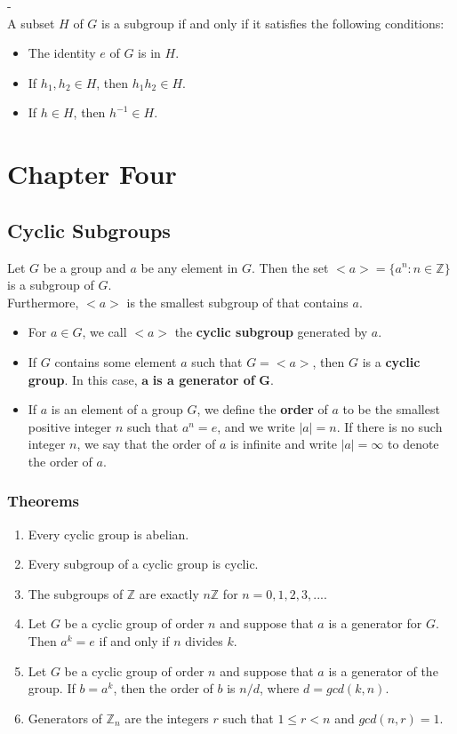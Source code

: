 \documentclass{article}
\begin{document}
-\\A subset $H$ of $G$ is a subgroup if and only if it satisfies the following conditions:
\begin{itemize}
    \item The identity $e$ of $G$ is in $H$.
    \item If $h_1,h_2\in H$, then $h_1 h_2\in H$.
    \item If $h\in H$, then $h^{-1}\in H$.
\end{itemize}

\section{Chapter Four}
\subsection{Cyclic Subgroups}
Let $G$ be a group and $a$ be any element in $G$. Then the set $<a>=\{a^{n}: n\in \mathbb{Z}\}$ is a subgroup of $G$. \\
Furthermore, $<a>$ is the smallest subgroup of that contains $a$.
\begin{itemize}
    \item For $a\in G$, we call $<a>$ the \textbf{cyclic subgroup} generated by $a$.
    \item If $G$ contains some element $a$ such that $G=<a>$, then $G$ is a \textbf{cyclic group}. In this case, $\mathbf{a}$ \textbf{is a generator of }$\mathbf{G}$.
    \item If $a$ is an element of a group $G$, we define the \textbf{order} of $a$ to be the smallest positive integer $n$ such that $a^n=e$, and we write $|a|=n$. If there is no such integer $n$, we say that the order of $a$ is infinite and write $|a|=\infty$ to denote the order of $a$.
\end{itemize}
\subsubsection{Theorems}
\begin{enumerate}
    \item Every cyclic group is abelian.
    \item Every subgroup of a cyclic group is cyclic.
    \item The subgroups of $\mathbb{Z}$ are exactly $n\mathbb{Z}$ for $n=0,1,2,3,...$.
    \item Let $G$ be a cyclic group of order $n$ and suppose that $a$ is a generator for $G$. Then $a^{k}=e$ if and only if $n$ divides $k$.
    \item Let $G$ be a cyclic group of order $n$ and suppose that $a$ is a generator of the group. If $b=a^k$, then the order of $b$ is $n/d$, where $d=gcd(k, n)$.
    \item Generators of $\mathbb{Z}_n$ are the integers $r$ such that $1\leq r<n$ and $gcd(n, r)=1$.
\end{enumerate}
\end{document}
